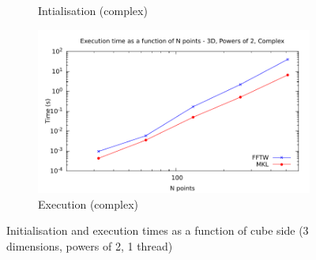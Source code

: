 \documentclass[12pt, a4paper]{article}
\begin{document}
\begin{figure}[H]
\begin{subfigure}{.5\textwidth}
\caption{Intialisation (complex)}
\label{3DPOW2CI}
\end{subfigure}%
\begin{subfigure}{.5\textwidth}
\centering
\includegraphics[width=.9\linewidth]{graphs/3d-pow2-exec-c.pdf}
\caption{Execution (complex)}
\label{3DPOW2C}
\end{subfigure}
\caption{Initialisation and execution times as a function of cube side (3 dimensions, powers of 2, 1 thread)}
\label{3DPOW2}
\end{figure}
\end{document}
